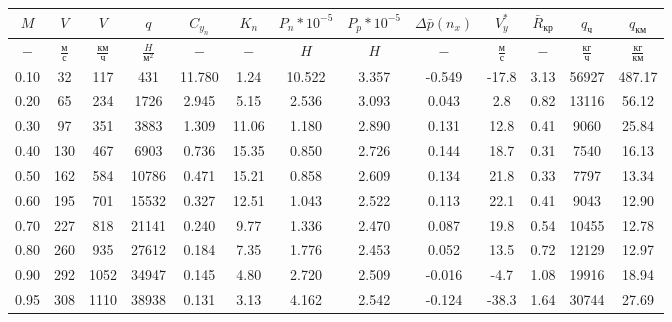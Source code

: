 \begin{tabular}{|c|c|c|c|c|c|c|c|c|c|c|c|c|}
\hline
$M$ & $V$ & $V$ & $q$ & $C_{y_n}$ & $K_n$ & $P_n*10^{-5}$ & $P_p*10^{-5}$ & $\Delta \bar{p}(n_x)$ & $V_y^*$ & $\bar{R}_{кр}$ & $q_{ч}$ & $q_{км}$ \\ 
\hline
$-$ & $\frac{м}{с}$ & $\frac{км}{ч}$ & $\frac{H}{м^2}$ & $-$ & $-$ & $H$ & $H$ & $-$ & $\frac{м}{с}$ & $-$ & $\frac{кг}{ч}$ & $\frac{кг}{км}$ \\ 
\hline
0.10 & 32 & 117 & 431 & 11.780 & 1.24 & 10.522 & 3.357 & -0.549 & -17.8 & 3.13 & 56927 & 487.17 \\ 
\hline
0.20 & 65 & 234 & 1726 & 2.945 & 5.15 & 2.536 & 3.093 & 0.043 & 2.8 & 0.82 & 13116 & 56.12 \\ 
\hline
0.30 & 97 & 351 & 3883 & 1.309 & 11.06 & 1.180 & 2.890 & 0.131 & 12.8 & 0.41 & 9060 & 25.84 \\ 
\hline
0.40 & 130 & 467 & 6903 & 0.736 & 15.35 & 0.850 & 2.726 & 0.144 & 18.7 & 0.31 & 7540 & 16.13 \\ 
\hline
0.50 & 162 & 584 & 10786 & 0.471 & 15.21 & 0.858 & 2.609 & 0.134 & 21.8 & 0.33 & 7797 & 13.34 \\ 
\hline
0.60 & 195 & 701 & 15532 & 0.327 & 12.51 & 1.043 & 2.522 & 0.113 & 22.1 & 0.41 & 9043 & 12.90 \\ 
\hline
0.70 & 227 & 818 & 21141 & 0.240 & 9.77 & 1.336 & 2.470 & 0.087 & 19.8 & 0.54 & 10455 & 12.78 \\ 
\hline
0.80 & 260 & 935 & 27612 & 0.184 & 7.35 & 1.776 & 2.453 & 0.052 & 13.5 & 0.72 & 12129 & 12.97 \\ 
\hline
0.90 & 292 & 1052 & 34947 & 0.145 & 4.80 & 2.720 & 2.509 & -0.016 & -4.7 & 1.08 & 19916 & 18.94 \\ 
\hline
0.95 & 308 & 1110 & 38938 & 0.131 & 3.13 & 4.162 & 2.542 & -0.124 & -38.3 & 1.64 & 30744 & 27.69 \\ 
\hline
\end{tabular}